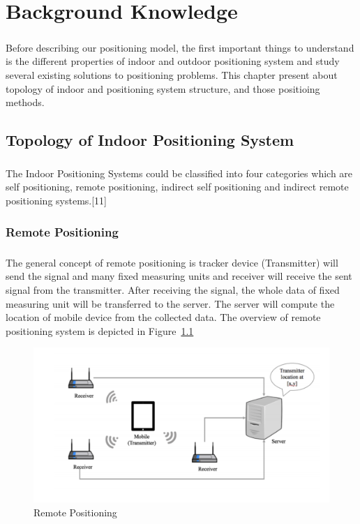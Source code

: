 \chapter{Background Knowledge}
\paragraph{} Before describing our positioning model, the first important things to understand is the different properties of indoor and outdoor positioning system and study several existing solutions to positioning problems. This chapter present about topology of indoor and positioning system structure, and those positioing methods.

\section{Topology of Indoor Positioning System}
\paragraph{} The Indoor Positioning Systems could be classified into four categories which are self positioning, remote positioning, indirect self positioning and indirect remote positioning systems.[11]

\subsection{Remote Positioning}
\paragraph{}The general concept of remote positioning is tracker device (Transmitter) will send the signal and many fixed measuring units and receiver will receive the sent signal from the transmitter. After receiving the signal, the whole data of fixed measuring unit will be transferred to the server. The server will compute the location of mobile device from the collected data. The overview of remote positioning system is depicted in Figure~\ref{fig:remote} 

\begin{figure}[h]
\centering
\includegraphics[width=\textwidth]{Image/remotepositioning.png}
\caption{Remote Positioning}
\label{fig:remote}
\end{figure}

